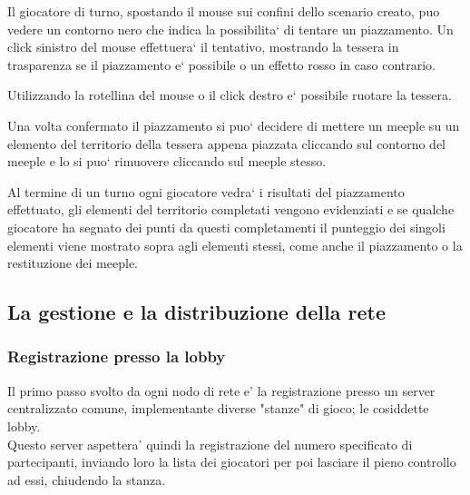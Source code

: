 Il giocatore di turno, spostando il mouse sui confini dello scenario creato, puo vedere un contorno nero che indica la possibilita` di tentare un piazzamento. Un click sinistro del mouse effettuera` il tentativo, mostrando la tessera in trasparenza se il piazzamento e` possibile o un effetto rosso in caso contrario. 

Utilizzando la rotellina del mouse o il click destro e` possibile ruotare la tessera.

Una volta confermato il piazzamento si puo` decidere di mettere un meeple su un elemento del territorio della tessera appena piazzata cliccando sul contorno del meeple e lo si puo` rimuovere cliccando sul meeple stesso.

Al termine di un turno ogni giocatore vedra` i risultati del piazzamento effettuato, gli elementi del territorio completati vengono evidenziati e se qualche giocatore ha segnato dei punti da questi completamenti il punteggio dei singoli elementi viene mostrato sopra agli elementi stessi, come anche il piazzamento o la restituzione dei meeple.

\subsection{La gestione e la distribuzione della rete}
	\subsubsection{Registrazione presso la lobby}
		Il primo passo svolto da ogni nodo di rete e' la registrazione
		presso un server centralizzato comune, implementante diverse
		"stanze" di gioco; le cosiddette lobby.\\
		Questo server aspettera' quindi la registrazione del numero
		specificato di partecipanti, inviando loro la lista dei
		giocatori per poi lasciare il pieno controllo
		ad essi, chiudendo la stanza.

